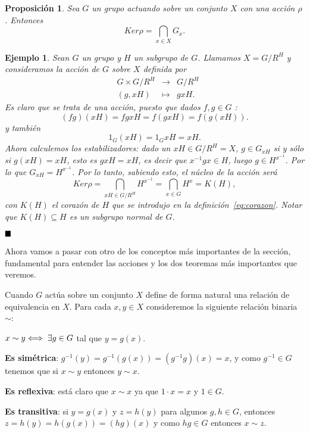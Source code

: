 \documentclass[12pt]{article}
\newtheorem{proposition}[theorem]{Proposición}
\newtheorem{example}{Ejemplo}[theorem]
\begin{document}
\begin{proposition}Sea $G$ un grupo actuando sobre un conjunto $X$ con una acción $\rho$. Entonces $$Ker\rho = \bigcap_{x\in X}G_{x}.$$
\end{proposition}

\begin{example}\label{eq:ejcorazon} Sean $G$ un grupo y $H$ un subgrupo de $G$. Llamamos $X = G/R^{H}$ y consideramos la acción de $G$ sobre $X$ definida por $$\begin{array}{rccl}
&G\times G/R^{H}& \longrightarrow &G/R^{H}\\
&(g,xH)& \longmapsto &gxH.
\end{array}
$$ Es claro que se trata de una acción, puesto que dados $f,g \in G$ : $$(fg)(xH)= fgxH = f(gxH) = f(g(xH)).$$ y también $$1_{G}(xH) = 1_{G}xH = xH.$$ Ahora calculemos los estabilizadores: dado un $xH \in G/R^{H} = X$, $g \in G_{xH}$ si y sólo si $g(xH) = xH$, esto es $gxH = xH$, es decir que $x^{-1}gx \in H$, luego $g \in H^{x^{-1}}$. Por lo que $G_{xH} = H^{x^{-1}}$. Por lo tanto, sabiendo esto, el núcleo de la acción será $$Ker\rho = \bigcap_{xH \in G/R^{H}} H^{x^{-1}} = \bigcap_{x\in G}H^{x} = K(H),$$ con $K(H)$ el \textit{corazón de $H$} que se introdujo en la definición~\ref{eq:corazon}. Notar que $K(H) \subseteq H$ es un subgrupo normal de $G$.
\end{example}
$\hfill \blacksquare$

Ahora vamos a pasar con otro de los conceptos más importantes de la sección, fundamental para entender las acciones y los dos teoremas más importantes que veremos. 

Cuando $G$ actúa sobre un conjunto $X$ define de forma natural una relación de equivalencia en $X$. Para cada $x,y \in X$ consideremos la siguiente relación binaria $\sim$: \begin{center}$x\sim y \Longleftrightarrow \hspace{0.1cm} \exists g \in G$ tal que $y = g(x)$.\end{center} 

\textbf{Es simétrica}: $g^{-1}(y) =g^{-1}(g(x))= (g^{-1}g)(x) = x$, y como $g^{-1} \in G$ tenemos que si $x\sim y$ entonces $y\sim x$. 

\textbf{Es reflexiva}: está claro que $x \sim x$ ya que $1 \cdot x = x$ y $1 \in G$.

\textbf{Es transitiva}: si $y=g(x)$ y $z= h(y)$ para algunos $g,h \in G$, entonces $z = h(y) = h(g(x)) = (hg)(x)$ y como $hg \in G$ entonces $x \sim z$.
\end{document}
